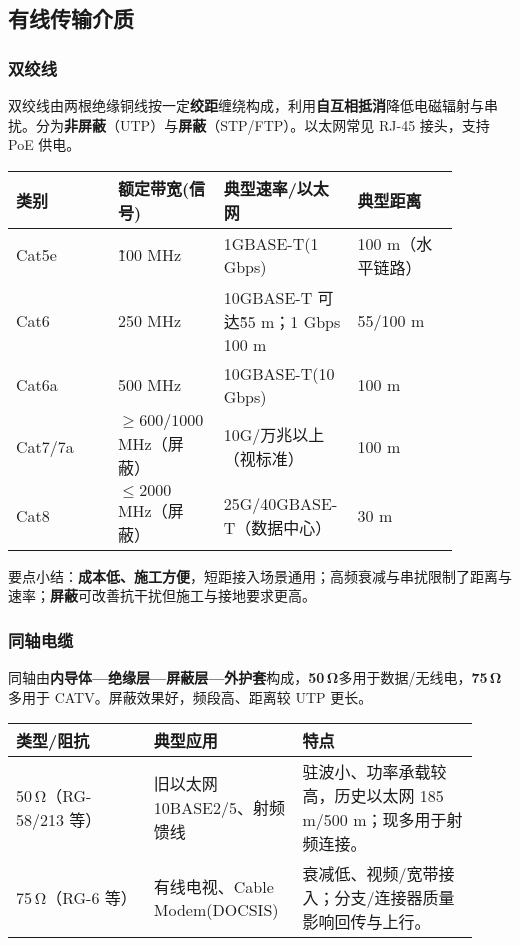 \documentclass[lang=cn,newtx,10pt,scheme=chinese]{../../elegantbook}
\begin{document}
\subsection{有线传输介质}
\subsubsection{双绞线}
双绞线由两根绝缘铜线按一定\textbf{绞距}缠绕构成，利用\textbf{自互相抵消}降低电磁辐射与串扰。分为\textbf{非屏蔽}（UTP）与\textbf{屏蔽}（STP/FTP）。以太网常见 RJ-45 接头，支持 PoE 供电。
\\
{\small\begin{longtable}{|p{0.22\linewidth}|p{0.22\linewidth}|p{0.22\linewidth}|p{0.22\linewidth}|}
\hline
    \textbf{类别} & \textbf{额定带宽(信号)} & \textbf{典型速率/以太网} & \textbf{典型距离} \\
\hline
Cat5e & \~100 MHz & 1GBASE-T(1 Gbps) & 100 m（水平链路） \\
\hline
Cat6 & 250 MHz & 10GBASE-T 可达\~55 m；1 Gbps 100 m & 55/100 m \\
\hline
Cat6a & 500 MHz & 10GBASE-T(10 Gbps) & 100 m \\
\hline
Cat7/7a & $\geq 600/1000$ MHz（屏蔽） & 10G/万兆以上（视标准） & 100 m \\
\hline
Cat8 & $\leq 2000$ MHz（屏蔽） & 25G/40GBASE-T（数据中心） & 30 m \\
\hline
\end{longtable}}

要点小结：\textbf{成本低、施工方便}，短距接入场景通用；高频衰减与串扰限制了距离与速率；\textbf{屏蔽}可改善抗干扰但施工与接地要求更高。
\subsubsection{同轴电缆}
同轴由\textbf{内导体—绝缘层—屏蔽层—外护套}构成，\textbf{50\,Ω}多用于数据/无线电，\textbf{75\,Ω}多用于 CATV。屏蔽效果好，频段高、距离较 UTP 更长。
\\
{\small\begin{longtable}{|p{0.28\linewidth}|p{0.28\linewidth}|p{0.36\linewidth}|}
\hline
    \textbf{类型/阻抗} & \textbf{典型应用} & \textbf{特点} \\
\hline
50\,Ω（RG-58/213 等） & 旧以太网 10BASE2/5、射频馈线 & 驻波小、功率承载较高，历史以太网 185 m/500 m；现多用于射频连接。\\
\hline
75\,Ω（RG-6 等） & 有线电视、Cable Modem(DOCSIS) & 衰减低、视频/宽带接入；分支/连接器质量影响回传与上行。\\
\hline
\end{longtable}}
\end{document}

